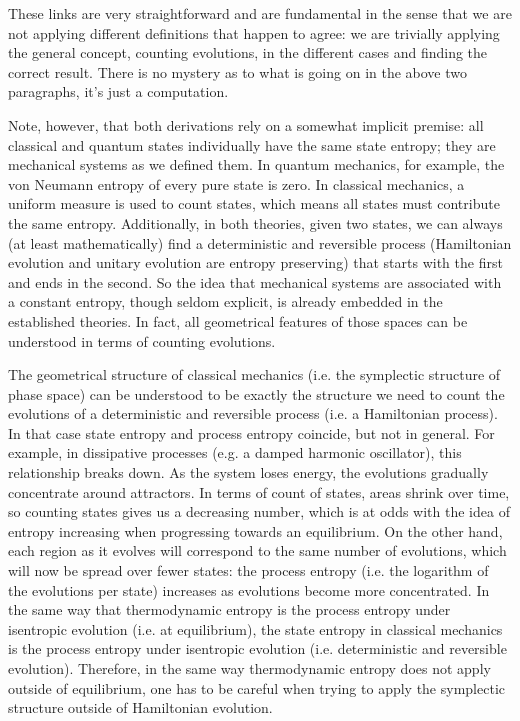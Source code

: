 \documentclass[letterpaper,twocolumn]{article}
\begin{document}
These links are very straightforward and are fundamental in the sense that we are not applying different definitions that happen to agree: we are trivially applying the general concept, counting evolutions, in the different cases and finding the correct result. There is no mystery as to what is going on in the above two paragraphs, it's just a computation.

Note, however, that both derivations rely on a somewhat implicit premise: all classical and quantum states individually have the same state entropy; they are mechanical systems as we defined them. In quantum mechanics, for example, the von Neumann entropy of every pure state is zero. In classical mechanics, a uniform measure is used to count states, which means all states must contribute the same entropy. Additionally, in both theories, given two states, we can always (at least mathematically) find a deterministic and reversible process (Hamiltonian evolution and unitary evolution are entropy preserving) that starts with the first and ends in the second. So the idea that mechanical systems are associated with a constant entropy, though seldom explicit, is already embedded in the established theories. In fact, all geometrical features of those spaces can be understood in terms of counting evolutions.

The geometrical structure of classical mechanics (i.e. the symplectic structure of phase space) can be understood to be exactly the structure we need to count the evolutions of a deterministic and reversible process (i.e. a Hamiltonian process). In that case state entropy and process entropy coincide, but not in general. For example, in dissipative processes (e.g. a damped harmonic oscillator), this relationship breaks down. As the system loses energy, the evolutions gradually concentrate around attractors. In terms of count of states, areas shrink over time, so counting states gives us a decreasing number, which is at odds with the idea of entropy increasing when progressing towards an equilibrium. On the other hand, each region as it evolves will correspond to the same number of evolutions, which will now be spread over fewer states: the process entropy (i.e. the logarithm of the evolutions per state) increases as evolutions become more concentrated. In the same way that thermodynamic entropy is the process entropy under isentropic evolution (i.e. at equilibrium), the state entropy in classical mechanics is the process entropy under isentropic evolution (i.e. deterministic and reversible evolution). Therefore, in the same way thermodynamic entropy does not apply outside of equilibrium, one has to be careful when trying to apply the symplectic structure outside of Hamiltonian evolution.
\end{document}
